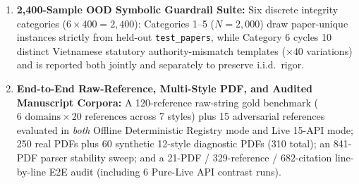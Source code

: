 \begin{enumerate}
\begin{itemize}
        \item \texttt{unresolved} ($12\%$, \texttt{U1}--\texttt{U2}): borderline title similarity inside $[0.40, 0.60)$ (\texttt{U1}) and upstream HTTP 429 rate-limit exhaustion or regional non-CSL DOIs (\texttt{U2}).
    \end{itemize}
    This benchmark isolates the decision and calibration layers (\texttt{SymbolicRules + HybridMLScorer + PlattCalibrator}) under known ground-truth retrieval signals rather than replacing live PDF/API evaluation. To eliminate trivial context shortcuts~\cite{poliak2018hypothesis}, full-abstract records are stratified across all four classes ($P(\texttt{verified} \mid \text{score} > 0) = 54.06\%$), and all 419,109 unique strings are encoded with live \texttt{all-MiniLM-L6-v2} embeddings without \texttt{np.clip} truncation.
    \item \textbf{2,400-Sample OOD Symbolic Guardrail Suite:} Six discrete integrity categories ($6 \times 400 = 2{,}400$): Categories 1--5 ($N = 2{,}000$) draw paper-unique instances strictly from held-out \texttt{test\_papers}, while Category 6 cycles 10 distinct Vietnamese statutory authority-mismatch templates ($\times 40$ variations) and is reported both jointly and separately to preserve i.i.d.\ rigor.
    \item \textbf{End-to-End Raw-Reference, Multi-Style PDF, and Audited Manuscript Corpora:} A 120-reference raw-string gold benchmark ($6\text{ domains} \times 20\text{ references}$ across 7 styles) plus 15 adversarial references evaluated in \emph{both} Offline Deterministic Registry mode and Live 15-API mode; 250 real PDFs plus 60 synthetic 12-style diagnostic PDFs (310 total); an 841-PDF parser stability sweep; and a 21-PDF / 329-reference / 682-citation line-by-line E2E audit (including 6 Pure-Live API contrast runs).
\end{enumerate}


